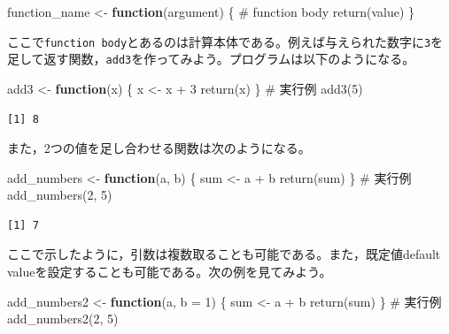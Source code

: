 \documentclass[
  a4paper,
]{ltjsbook}
\newenvironment{Shaded}{\begin{snugshade}}{\end{snugshade}}
\newcommand{\AttributeTok}[1]{\textcolor[rgb]{0.40,0.45,0.13}{#1}}
\newcommand{\CommentTok}[1]{\textcolor[rgb]{0.37,0.37,0.37}{#1}}
\newcommand{\ControlFlowTok}[1]{\textcolor[rgb]{0.00,0.23,0.31}{\textbf{#1}}}
\newcommand{\DecValTok}[1]{\textcolor[rgb]{0.68,0.00,0.00}{#1}}
\newcommand{\FunctionTok}[1]{\textcolor[rgb]{0.28,0.35,0.67}{#1}}
\newcommand{\NormalTok}[1]{\textcolor[rgb]{0.00,0.23,0.31}{#1}}
\newcommand{\OtherTok}[1]{\textcolor[rgb]{0.00,0.23,0.31}{#1}}
\newcommand{\SpecialCharTok}[1]{\textcolor[rgb]{0.37,0.37,0.37}{#1}}
\begin{document}
\begin{Shaded}
\begin{Highlighting}[]
\NormalTok{function\_name }\OtherTok{\textless{}{-}} \ControlFlowTok{function}\NormalTok{(argument) \{}
   \CommentTok{\# function body}
   \FunctionTok{return}\NormalTok{(value)}
\NormalTok{\}}
\end{Highlighting}
\end{Shaded}

ここで\texttt{function\ body}とあるのは計算本体である。例えば与えられた数字に\texttt{3}を足して返す関数，\texttt{add3}を作ってみよう。プログラムは以下のようになる。

\begin{Shaded}
\begin{Highlighting}[]
\NormalTok{add3 }\OtherTok{\textless{}{-}} \ControlFlowTok{function}\NormalTok{(x) \{}
\NormalTok{  x }\OtherTok{\textless{}{-}}\NormalTok{ x }\SpecialCharTok{+} \DecValTok{3}
  \FunctionTok{return}\NormalTok{(x)}
\NormalTok{\}}
\CommentTok{\# 実行例}
\FunctionTok{add3}\NormalTok{(}\DecValTok{5}\NormalTok{)}
\end{Highlighting}
\end{Shaded}

\begin{verbatim}
[1] 8
\end{verbatim}

また，2つの値を足し合わせる関数は次のようになる。

\begin{Shaded}
\begin{Highlighting}[]
\NormalTok{add\_numbers }\OtherTok{\textless{}{-}} \ControlFlowTok{function}\NormalTok{(a, b) \{}
\NormalTok{  sum }\OtherTok{\textless{}{-}}\NormalTok{ a }\SpecialCharTok{+}\NormalTok{ b}
  \FunctionTok{return}\NormalTok{(sum)}
\NormalTok{\}}
\CommentTok{\# 実行例}
\FunctionTok{add\_numbers}\NormalTok{(}\DecValTok{2}\NormalTok{, }\DecValTok{5}\NormalTok{)}
\end{Highlighting}
\end{Shaded}

\begin{verbatim}
[1] 7
\end{verbatim}

ここで示したように，引数は複数取ることも可能である。また，既定値default
valueを設定することも可能である。次の例を見てみよう。

\begin{Shaded}
\begin{Highlighting}[]
\NormalTok{add\_numbers2 }\OtherTok{\textless{}{-}} \ControlFlowTok{function}\NormalTok{(a, }\AttributeTok{b =} \DecValTok{1}\NormalTok{) \{}
\NormalTok{  sum }\OtherTok{\textless{}{-}}\NormalTok{ a }\SpecialCharTok{+}\NormalTok{ b}
  \FunctionTok{return}\NormalTok{(sum)}
\NormalTok{\}}
\CommentTok{\# 実行例}
\FunctionTok{add\_numbers2}\NormalTok{(}\DecValTok{2}\NormalTok{, }\DecValTok{5}\NormalTok{)}
\end{Highlighting}
\end{Shaded}
\end{document}
